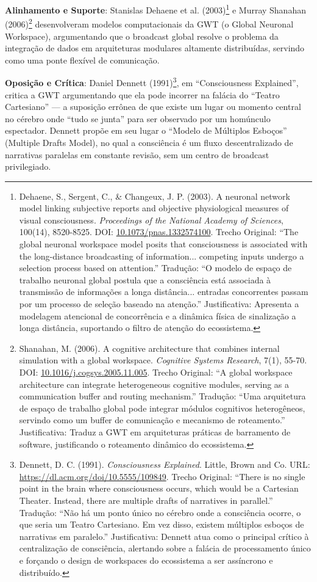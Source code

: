 \documentclass[12pt,a4paper,oneside]{abntex2}
\begin{document}
\textbf{Alinhamento e Suporte}: Stanislas Dehaene et al. (2003)\footnote{Dehaene, S., Sergent, C., \& Changeux, J. P. (2003). A neuronal network model linking subjective reports and objective physiological measures of visual consciousness. \textit{Proceedings of the National Academy of Sciences}, 100(14), 8520-8525. DOI: \href{https://doi.org/10.1073/pnas.1332574100}{10.1073/pnas.1332574100}. Trecho Original: ``The global neuronal workspace model posits that consciousness is associated with the long-distance broadcasting of information... competing inputs undergo a selection process based on attention.'' Tradução: ``O modelo de espaço de trabalho neuronal global postula que a consciência está associada à transmissão de informações a longa distância... entradas concorrentes passam por um processo de seleção baseado na atenção.'' Justificativa: Apresenta a modelagem atencional de concorrência e a dinâmica física de sinalização a longa distância, suportando o filtro de atenção do ecossistema.} e Murray Shanahan (2006)\footnote{Shanahan, M. (2006). A cognitive architecture that combines internal simulation with a global workspace. \textit{Cognitive Systems Research}, 7(1), 55-70. DOI: \href{https://doi.org/10.1016/j.cogsys.2005.11.005}{10.1016/j.cogsys.2005.11.005}. Trecho Original: ``A global workspace architecture can integrate heterogeneous cognitive modules, serving as a communication buffer and routing mechanism.'' Tradução: ``Uma arquitetura de espaço de trabalho global pode integrar módulos cognitivos heterogêneos, servindo como um buffer de comunicação e mecanismo de roteamento.'' Justificativa: Traduz a GWT em arquiteturas práticas de barramento de software, justificando o roteamento dinâmico do ecossistema.} desenvolveram modelos computacionais da GWT (o Global Neuronal Workspace), argumentando que o broadcast global resolve o problema da integração de dados em arquiteturas modulares altamente distribuídas, servindo como uma ponte flexível de comunicação.

\textbf{Oposição e Crítica}: Daniel Dennett (1991)\footnote{Dennett, D. C. (1991). \textit{Consciousness Explained}. Little, Brown and Co. URL: \href{https://dl.acm.org/doi/10.5555/109849}{https://dl.acm.org/doi/10.5555/109849}. Trecho Original: ``There is no single point in the brain where consciousness occurs, which would be a Cartesian Theater. Instead, there are multiple drafts of narratives in parallel.'' Tradução: ``Não há um ponto único no cérebro onde a consciência ocorre, o que seria um Teatro Cartesiano. Em vez disso, existem múltiplos esboços de narrativas em paralelo.'' Justificativa: Dennett atua como o principal crítico à centralização de consciência, alertando sobre a falácia de processamento único e forçando o design de workspaces do ecossistema a ser assíncrono e distribuído.}, em ``Consciousness Explained'', critica a GWT argumentando que ela pode incorrer na falácia do ``Teatro Cartesiano'' — a suposição errônea de que existe um lugar ou momento central no cérebro onde ``tudo se junta'' para ser observado por um homúnculo espectador. Dennett propõe em seu lugar o ``Modelo de Múltiplos Esboços'' (Multiple Drafts Model), no qual a consciência é um fluxo descentralizado de narrativas paralelas em constante revisão, sem um centro de broadcast privilegiado.
\end{document}
